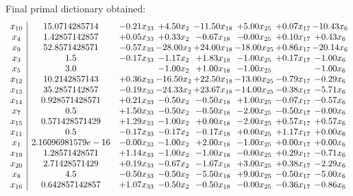 \documentclass[8pt]{article}
\begin{document}
 Final primal dictionary obtained: 
\[\begin{array}{c| c c@{\hskip 2pt} c@{\hskip 2pt} c@{\hskip 2pt} c@{\hskip 2pt} c@{\hskip 2pt} c@{\hskip 2pt} }
 x_{10}   &  15.0714285714 & -0.21 x_{33} & +  4.50 x_{2} & -11.50 x_{18} & +  5.00 x_{25} & +  0.07 x_{17} & -10.43 x_{6}\\
 x_{4}   &  1.42857142857 & +  0.05 x_{33} & +  0.33 x_{2} & -0.67 x_{18} & -0.00 x_{25} & +  0.10 x_{17} & +  0.43 x_{6}\\
 x_{9}   &  52.8571428571 & -0.57 x_{33} & -28.00 x_{2} & + 24.00 x_{18} & -18.00 x_{25} & +  0.86 x_{17} & -20.14 x_{6}\\
 x_{3}   &  1.5 & -0.17 x_{33} & -1.17 x_{2} & +  1.83 x_{18} & -1.00 x_{25} & +  0.17 x_{17} & -1.00 x_{6}\\
 x_{5}   &  3.0  &   & -1.00 x_{2} & +  1.00 x_{18} & -1.00 x_{25} &   & -1.00 x_{6}\\
 x_{12}   &  10.2142857143 & +  0.36 x_{33} & -16.50 x_{2} & + 22.50 x_{18} & -13.00 x_{25} & -0.79 x_{17} & -0.29 x_{6}\\
 x_{13}   &  35.2857142857 & -0.19 x_{33} & -24.33 x_{2} & + 23.67 x_{18} & -14.00 x_{25} & -0.38 x_{17} & -5.71 x_{6}\\
 x_{14}   &  0.928571428571 & +  0.21 x_{33} & -0.50 x_{2} & -0.50 x_{18} & +  1.00 x_{25} & -0.07 x_{17} & -0.57 x_{6}\\
 x_{7}   &  0.5 & +  1.50 x_{33} & -0.50 x_{2} & -0.50 x_{18} & -2.00 x_{25} & -0.50 x_{17} & -0.00 x_{6}\\
 x_{15}   &  0.571428571429 & +  1.29 x_{33} & -1.00 x_{2} & +  0.00 x_{18} & -2.00 x_{25} & +  0.57 x_{17} & +  0.57 x_{6}\\
 x_{11}   &  0.5 & -0.17 x_{33} & -0.17 x_{2} & -0.17 x_{18} & +  0.00 x_{25} & +  1.17 x_{17} & +  0.00 x_{6}\\
 x_{1}   &  2.16096981579e-16 & -0.00 x_{33} & -1.00 x_{2} & +  2.00 x_{18} & -1.00 x_{25} & +  0.00 x_{17} & +  0.00 x_{6}\\
 x_{19}   &  1.28571428571 & +  1.14 x_{33} & -1.00 x_{2} & -1.00 x_{18} & -0.00 x_{25} & +  0.29 x_{17} & -0.71 x_{6}\\
 x_{20}   &  2.71428571429 & +  0.19 x_{33} & -0.67 x_{2} & -1.67 x_{18} & +  3.00 x_{25} & +  0.38 x_{17} & -2.29 x_{6}\\
 x_{8}   &  4.5 & -0.50 x_{33} & -0.50 x_{2} & -5.50 x_{18} & +  9.00 x_{25} & -0.50 x_{17} & -5.00 x_{6}\\
 x_{16}   &  0.642857142857 & +  1.07 x_{33} & -0.50 x_{2} & -0.50 x_{18} & -0.00 x_{25} & -0.36 x_{17} & -0.86 x_{6}\\

\end{array}\]
\end{document}
